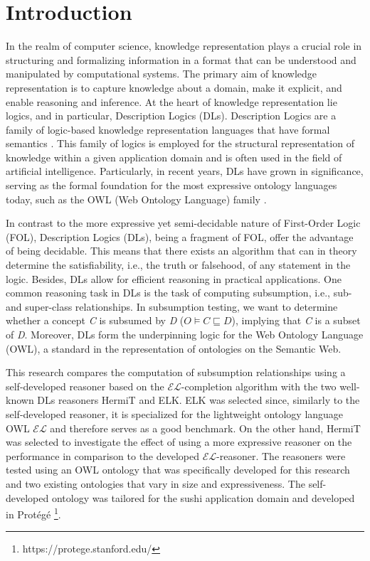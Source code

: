 \documentclass[a4paper]{article}
\theoremstyle{plain}
\theoremstyle{definition}
\begin{document}
    \section{Introduction}
In the realm of computer science, knowledge representation plays a crucial role in structuring and formalizing information in a format that can be understood and manipulated by computational systems. The primary aim of knowledge representation is to capture knowledge about a domain, make it explicit, and enable reasoning and inference. At the heart of knowledge representation lie logics, and in particular, Description Logics (DLs). Description Logics are a family of logic-based knowledge representation languages that have formal semantics \cite{baaderDL}. This family of logics is employed for the structural representation of knowledge within a given application domain and is often used in the field of artificial intelligence. 
Particularly, in recent years, DLs have grown in significance, serving as the formal foundation for the most expressive ontology languages today, such as the OWL (Web Ontology Language) family \cite{rudolph}.

In contrast to the more expressive yet semi-decidable nature of First-Order Logic (FOL), Description Logics (DLs), being a fragment of FOL, offer the advantage of being decidable. This means that there exists an algorithm that can in theory determine the satisfiability, i.e., the truth or falsehood, of any statement in the logic. Besides, DLs allow for efficient reasoning in practical applications. One common reasoning task in DLs is the task of computing subsumption, i.e., sub- and super-class relationships. In subsumption testing, we want to determine whether a concept \textit{C} is subsumed by \textit{D} ($O \models C \sqsubseteq D$), implying that \textit{C} is a subset of \textit{D}. Moreover, DLs form the underpinning logic for the Web Ontology Language (OWL), a standard in the representation of ontologies on the Semantic Web.

This research compares the computation of subsumption relationships using a self-developed reasoner based on the $\mathcal{EL}$-completion algorithm with the two well-known DLs reasoners HermiT and ELK. ELK was selected since, similarly to the self-developed reasoner, it is specialized for the lightweight ontology language OWL $\mathcal{EL}$ and therefore serves as a good benchmark. On the other hand, HermiT was selected to investigate the effect of using a more expressive reasoner on the performance in comparison to the developed $\mathcal{EL}$-reasoner. The reasoners were tested using an OWL ontology that was specifically developed for this research and two existing ontologies that vary in size and expressiveness. The self-developed ontology was tailored for the sushi application domain and developed in Protégé \footnote{https://protege.stanford.edu/}.
\end{document}
